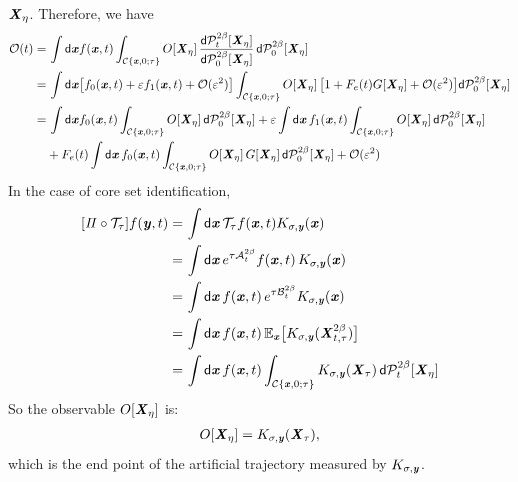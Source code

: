 \documentclass[aip,jcp,a4paper,reprint,onecolumn]{revtex4-1}
\newcommand{\vect}[1]{\textbf{\textit{#1}}}
\newcommand{\dd}{\textsf{d}}
\newcommand{\mt}{\mathcal T}
\newcommand{\mo}{\mathcal O}
\newcommand{\mc}{\mathcal C}
\newcommand{\proj}{\mathit\Pi}
\newcommand{\fwg}{{\mathcal A}}
\newcommand{\bwg}{{\mathcal B}}
\begin{document}
$\vect X_\eta$.
Therefore, we have
\begin{align}\nonumber
  \mo(t)
  =&\,
  \int \dd \vect x
  f(\vect x, t)
  \int_{\mc\{\vect x,0;\tau\}}
  O[\vect X_\eta]\,
  \frac{\dd \mathcal P^{2\beta}_t[\vect X_\eta]}
  {\dd \mathcal P^{2\beta}_0[\vect X_\eta]}\,
  \dd \mathcal P^{2\beta}_0[\vect X_\eta]  \\\nonumber
  =&\,
  \int \dd \vect x
  \big[
  f_{0}(\vect x, t)
  + \varepsilon f_{1}(\vect x, t)
  + \mo(\varepsilon^2)
  \big]
  \int_{\mc\{\vect x,0;\tau\}}
  O[\vect X_\eta]\,
  \big[
  1 
  + F_e(t) G[\vect X_\eta]
  + \mo(\varepsilon^2)
  \big]
  \dd \mathcal P^{2\beta}_0[\vect X_\eta]
  \\\nonumber
  =&\,
  \int \dd \vect x
  f_{0}(\vect x, t)
  \int_{\mc\{\vect x,0;\tau\}}
  O[\vect X_\eta]\,
  \dd \mathcal P^{2\beta}_0[\vect X_\eta]
  +
  \varepsilon
  \int \dd \vect x\,
  f_{1}(\vect x, t)
  \int_{\mc\{\vect x,0;\tau\}}
  O[\vect X_\eta]\,
  \dd \mathcal P^{2\beta}_0[\vect X_\eta]\\\label{eqn:solve-tau-linear-2-0}
  &+
  F_e(t)
  \int \dd \vect x\,
  f_{0}(\vect x, t)
  \int_{\mc\{\vect x,0;\tau\}}
  O[\vect X_\eta]\,
  G[\vect X_\eta]\,
  \dd \mathcal P^{2\beta}_0[\vect X_\eta]
  + \mo(\varepsilon^2) 
\end{align}
In the case of core set identification,
\begin{align}\nonumber
  [\proj\circ \mt_\tau] f(\vect y,t)
  =&\,
  \int\dd \vect x\,
  \mt_\tau f(\vect x,t) K_{\sigma,\vect y}(\vect x)\\\nonumber
  =&\,
  \int\dd \vect x\,
  e^{\tau\fwg_t^{2\beta}} f(\vect x,t) \,K_{\sigma,\vect y}(\vect x)\\\nonumber
  =&\,
  \int\dd \vect x\,
  f(\vect x,t) \,e^{\tau\bwg_t^{2\beta}}K_{\sigma,\vect y}(\vect x)  \\\nonumber
  =&\,
  \int\dd \vect x\,
  f(\vect x,t) \,\mathbb E_{\vect x}
  \big[
  K_{\sigma,\vect y}(\vect X^{2\beta}_{t,\tau})
  \big]  
  \\
  =&\,
  \int\dd \vect x\,
  f(\vect x,t) 
  \int_{\mc\{\vect x,0;\tau\}} K_{\sigma,\vect y}(\vect X_\tau)\,
  \dd\mathcal P^{2\beta}_t[\vect X_\eta]
\end{align}
So the observable $O[\vect X_\eta]$
is:
\begin{align}
  O[\vect X_\eta] = 
  K_{\sigma,\vect y}(\vect X_\tau),
\end{align}
which is the end point of the artificial
trajectory measured by $K_{\sigma,\vect y}$.
\end{document}
